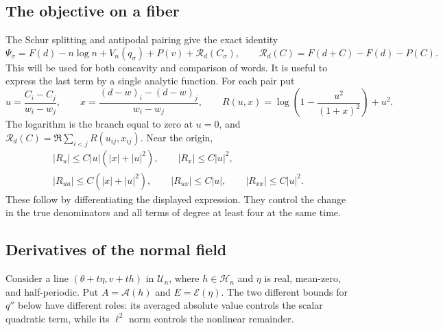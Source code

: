 \documentclass[11pt,reqno]{amsart}
\numberwithin{equation}{section}
\theoremstyle{definition}
\theoremstyle{remark}
\newcommand{\A}{\mathcal A}
\newcommand{\E}{\mathcal E}
\newcommand{\HH}{\mathcal H_n}
\newcommand{\UU}{\mathscr U_n}
\begin{document}
\subsection{The objective on a fiber}
The Schur splitting and antipodal pairing give the exact identity
\begin{equation}\label{eq:fiber-master}
 \Psi_\sigma=F(d)-n\log n+V_n(q_\sigma)+P(v)+\mathscr R_d(C_\sigma),
 \qquad \mathscr R_d(C)=F(d+C)-F(d)-P(C).
\end{equation}
This will be used for both concavity and comparison of words. It is useful to express the last term by a single analytic function. For each pair put
\[
 u=\frac{C_i-C_j}{w_i-w_j},\qquad
 x=\frac{(d-w)_i-(d-w)_j}{w_i-w_j},\qquad
 R(u,x)=\log\left(1-\frac{u^2}{(1+x)^2}\right)+u^2.
\]
The logarithm is the branch equal to zero at $u=0$, and
$\mathscr R_d(C)=\Re\sum_{i<j}R(u_{ij},x_{ij})$. Near the origin,
\begin{equation}\label{eq:fiber-Rbounds}
 \begin{gathered}
 |R_u|\le C|u|(|x|+|u|^2),\qquad |R_x|\le C|u|^2,\\
 |R_{uu}|\le C(|x|+|u|^2),\qquad
 |R_{ux}|\le C|u|,\qquad |R_{xx}|\le C|u|^2.
 \end{gathered}
\end{equation}
These follow by differentiating the displayed expression. They control the change in the true denominators and all terms of degree at least four at the same time.

\subsection{Derivatives of the normal field}
Consider a line $(\theta+t\eta,v+th)$ in $\UU$, where $h\in\HH$ and $\eta$ is real, mean-zero, and half-periodic. Put $A=\A(h)$ and $E=\E(\eta)$. The two different bounds for $q''$ below have different roles: its averaged absolute value controls the scalar quadratic term, while its $\ell^2$ norm controls the nonlinear remainder.
\end{document}
